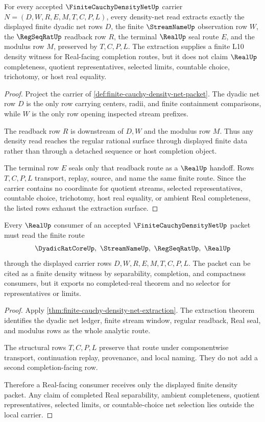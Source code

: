 \begin{theorem}
\label{thm:finite-cauchy-density-net-extraction}
For every accepted $\FiniteCauchyDensityNetUp$ carrier $N=(D,W,R,E,M,T,C,P,L)$, every density-net read extracts exactly the displayed finite dyadic net rows $D$, the finite $\StreamNameUp$ observation row $W$, the $\RegSeqRatUp$ readback row $R$, the terminal $\RealUp$ seal route $E$, and the modulus row $M$, preserved by $T,C,P,L$. The extraction supplies a finite L10 density witness for Real-facing completion routes, but it does not claim $\RealUp$ completeness, quotient representatives, selected limits, countable choice, trichotomy, or host real equality.
\end{theorem}
\begin{proof}
Project the carrier of \autoref{def:finite-cauchy-density-net-packet}. The dyadic net row $D$ is the only row carrying centers, radii, and finite containment comparisons, while $W$ is the only row opening inspected stream prefixes.

The readback row $R$ is downstream of $D,W$ and the modulus row $M$. Thus any density read reaches the regular rational surface through displayed finite data rather than through a detached sequence or host completion object.

The terminal row $E$ seals only that readback route as a $\RealUp$ handoff. Rows $T,C,P,L$ transport, replay, source, and name the same finite route. Since the carrier contains no coordinate for quotient streams, selected representatives, countable choice, trichotomy, host real equality, or ambient Real completeness, the listed rows exhaust the extraction surface.
\end{proof}

\begin{theorem}
\label{thm:finite-cauchy-density-net-real-seal-nonescape}
Every $\RealUp$ consumer of an accepted $\FiniteCauchyDensityNetUp$ packet must read the finite route
$$
\DyadicRatCoreUp,\ \StreamNameUp,\ \RegSeqRatUp,\ \RealUp
$$
through the displayed carrier rows $D,W,R,E,M,T,C,P,L$. The packet can be cited as a finite density witness by separability, completion, and compactness consumers, but it exports no completed-real theorem and no selector for representatives or limits.
\end{theorem}
\begin{proof}
Apply \autoref{thm:finite-cauchy-density-net-extraction}. The extraction theorem identifies the dyadic net ledger, finite stream window, regular readback, Real seal, and modulus rows as the whole analytic route.

The structural rows $T,C,P,L$ preserve that route under componentwise transport, continuation replay, provenance, and local naming. They do not add a second completion-facing row.

Therefore a Real-facing consumer receives only the displayed finite density packet. Any claim of completed Real separability, ambient completeness, quotient representatives, selected limits, or countable-choice net selection lies outside the local carrier.
\end{proof}

